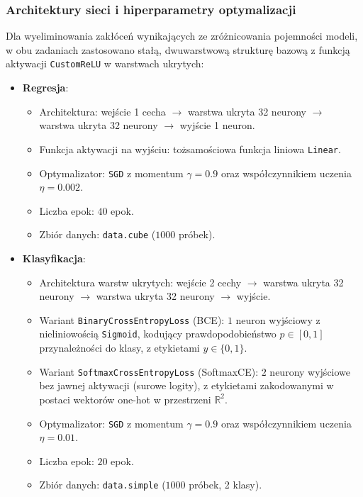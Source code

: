 \documentclass[11pt,a4paper]{article}
\begin{document}
\subsubsection{Architektury sieci i hiperparametry optymalizacji}
Dla wyeliminowania zakłóceń wynikających ze zróżnicowania pojemności modeli, w obu zadaniach zastosowano stałą, dwuwarstwową strukturę bazową z funkcją aktywacji \texttt{CustomReLU} w warstwach ukrytych:
\begin{itemize}
    \item \textbf{Regresja}:
    \begin{itemize}
        \item Architektura: wejście 1 cecha $\to$ warstwa ukryta 32 neurony $\to$ warstwa ukryta 32 neurony $\to$ wyjście 1 neuron.
        \item Funkcja aktywacji na wyjściu: tożsamościowa funkcja liniowa \texttt{Linear}.
        \item Optymalizator: \texttt{SGD} z momentum $\gamma = 0.9$ oraz współczynnikiem uczenia $\eta = 0.002$.
        \item Liczba epok: $40$ epok.
        \item Zbiór danych: \texttt{data.cube} ($1000$ próbek).
    \end{itemize}
    \item \textbf{Klasyfikacja}:
    \begin{itemize}
        \item Architektura warstw ukrytych: wejście 2 cechy $\to$ warstwa ukryta 32 neurony $\to$ warstwa ukryta 32 neurony $\to$ wyjście.
        \item Wariant \texttt{BinaryCrossEntropyLoss} (BCE): $1$ neuron wyjściowy z nieliniowością \texttt{Sigmoid}, kodujący prawdopodobieństwo $p \in [0, 1]$ przynależności do klasy, z etykietami $y \in \{0, 1\}$.
        \item Wariant \texttt{SoftmaxCrossEntropyLoss} (SoftmaxCE): $2$ neurony wyjściowe bez jawnej aktywacji (surowe logity), z etykietami zakodowanymi w postaci wektorów one-hot w przestrzeni $\mathbb{R}^2$.
        \item Optymalizator: \texttt{SGD} z momentum $\gamma = 0.9$ oraz współczynnikiem uczenia $\eta = 0.01$.
        \item Liczba epok: $20$ epok.
        \item Zbiór danych: \texttt{data.simple} ($1000$ próbek, 2 klasy).
    \end{itemize}
\end{itemize}
\end{document}
